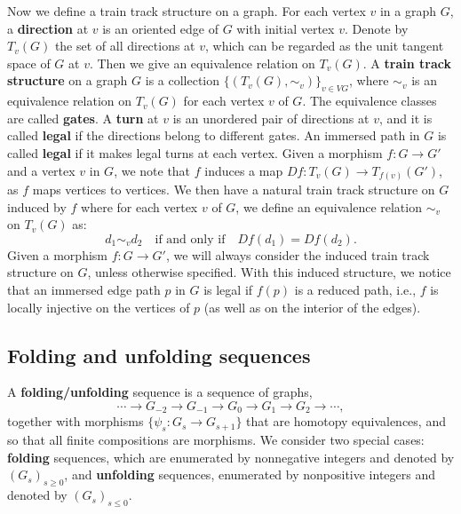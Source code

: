 \documentclass[11pt, letterpaper]{amsart}
\theoremstyle{plain}
\theoremstyle{definition}
\begin{document}
Now we define a train track structure on a graph.
For each vertex $v$ in a graph $G$, a \textbf{direction} at $v$ is an oriented edge
of $G$ with initial vertex $v$. Denote by $T_v(G)$ the set of all directions at
$v$, which can be regarded as the unit tangent space of $G$ at $v$. Then we give an
equivalence relation on $T_v(G)$. A \textbf{train track structure} on a graph
$G$ is a collection $\{(T_v(G), \sim_v)\}_{v \in VG}$, where $\sim_v$ is an equivalence
relation on $T_v(G)$ for each vertex $v$ of $G$. The equivalence classes are
called \textbf{gates}.
  A \textbf{turn} at $v$ is an unordered pair of directions at $v$, and it is
  called \textbf{legal} if the directions belong to different gates.
An immersed path in $G$ is called \textbf{legal} if it makes legal turns at
each vertex. 
Given a morphism $f: G \to G'$
and a vertex $v$ in $G$, we note that $f$ induces a map $Df: T_v(G) \to T_{f(v)}(G')$, as $f$ maps vertices to vertices. We then have a natural train track structure on $G$ induced by $f$ where for each vertex $v$ of $G$, we define an equivalence relation $\sim_v$ on $T_v(G)$ as:
\[
  d_1 \sim_v d_2 \quad \text{if and only if} \quad Df(d_1) = Df(d_2).
\]
Given a morphism $f:G \to G'$, we will always consider the induced train track structure on $G$, unless otherwise specified.
With this induced structure, we
notice that an immersed edge path $p$ in $G$ is legal if $f(p)$ is a reduced path, i.e., $f$ is
locally injective on the vertices of $p$ (as well as on the interior of the edges).

\subsection{Folding and unfolding sequences}
\label{ssec:sequences}

A \textbf{folding/unfolding} sequence is a sequence of graphs,
\[
\cdots \to G_{-2} \to G_{-1} \to G_0 \to G_1 \to G_2 \to \cdots,
\]
together with morphisms $\{\psi_s: G_s \to G_{s+1}\}$ that are homotopy
equivalences, and so that all finite compositions are morphisms.
We consider two special cases: \textbf{folding} sequences, which are
  enumerated by nonnegative integers and
denoted by
$(G_s)_{s \ge 0}$, and \textbf{unfolding} sequences, enumerated by nonpositive integers and denoted by $(G_s)_{s \le 0}$.
\end{document}
